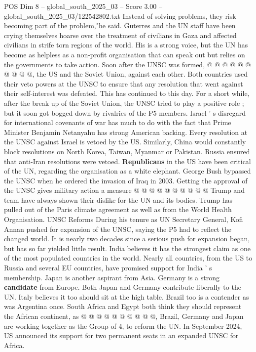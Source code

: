 \begin{textsample}{POS Dim 8 – global\_south\_2025\_03 – Score 3.00 – global\_south\_2025\_03/122542802.txt}
Instead of solving problems, they risk becoming part of the problem,"he said.
Guterres and the UN staff have been crying themselves hoarse over the treatment of civilians in Gaza and affected civilians in strife torn regions of the world.
His is a strong voice, but the UN has become as helpless as a non-profit organisation that can speak out but relies on the governments to take action.
Soon after the UNSC was formed, @ @ @ @ @ @ @ @ @ @, the US and the Soviet Union, against each other.
Both countries used their veto powers at the UNSC to ensure that any resolution that went against their self-interest was defeated.
This has continued to this day.
For a short while, after the break up of the Soviet Union, the UNSC tried to play a positive role ; but it soon got bogged down by rivalries of the P5 members.
Israel ' s disregard for international covenants of war has much to do with the fact that Prime Minister Benjamin Netanyahu has strong American backing.
Every resolution at the UNSC against Israel is vetoed by the US.
Similarly, China would constantly block resolutions on North Korea, Taiwan, Myanmar or Pakistan.
Russia ensured that anti-Iran resolutions were vetoed. \textbf{Republicans} in the US have been critical of the UN, regarding the organisation as a white elephant.
George Bush bypassed the UNSC when he ordered the invasion of Iraq in 2003.
Getting the approval of the UNSC gives military action a measure @ @ @ @ @ @ @ @ @ @ Trump and team have always shown their dislike for the UN and its bodies.
Trump has pulled out of the Paris climate agreement as well as from the World Health Organisation.
UNSC Reforms During his tenure as UN Secretary General, Kofi Annan pushed for expansion of the UNSC, saying the P5 had to reflect the changed world.
It is nearly two decades since a serious push for expansion began, but has so far yielded little result.
India believes it has the strongest claim as one of the most populated countries in the world.
Nearly all countries, from the US to Russia and several EU countries, have promised support for India ' s membership.
Japan is another aspirant from Asia.
Germany is a strong \textbf{candidate} from Europe.
Both Japan and Germany contribute liberally to the UN.
Italy believes it too should sit at the high table.
Brazil too is a contender as was Argentina once.
South Africa and Egypt both think they should represent the African continent, as @ @ @ @ @ @ @ @ @ @, Brazil, Germany and Japan are working together as the Group of 4, to reform the UN.
In September 2024, US announced its support for two permanent seats in an expanded UNSC for Africa.

\end{textsample}
